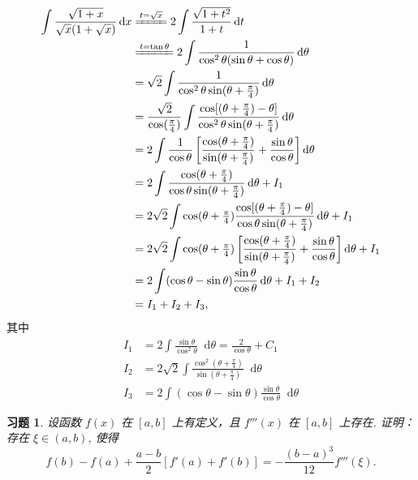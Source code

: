 \documentclass{ctexart}
\renewcommand\dif{\mathop{}\!\mathrm{d}}
\newcommand{\dx}{\ensuremath{\dif x}}
\newcommand{\dt}{\ensuremath{\dif t}}
\theoremstyle{plain}
\newtheorem{exercise}{习题}[subsection]
\theoremstyle{definition}
\begin{document}
\begin{align*}
    \int \frac{\sqrt{1 + x}}{\sqrt{x} (1 + \sqrt{x})} \dx
    &\xlongequal{t = \sqrt{x}} 2\int \frac{\sqrt{1 + t^2}}{1 + t} \dt \\
    &\xlongequal{t = \tan \theta} 2\int \frac{1}{\cos^2 \theta (\sin\theta + \cos\theta)} \dif \theta \\
    &= \sqrt{2} \int \frac{1}{\cos^2 \theta \sin(\theta + \frac \pi4)} \dif \theta \\
    &= \frac{\sqrt{2}}{\cos(\frac \pi4)} \int \frac{\cos[(\theta + \frac \pi4) - \theta]}{\cos^2 \theta \sin(\theta + \frac \pi4)} \dif \theta \\
    &= 2 \int \frac{1}{\cos\theta} 
        \sbr[3]{\frac{\cos(\theta + \frac \pi4)}{\sin(\theta + \frac \pi4)}
            + \frac{\sin\theta}{\cos\theta}}  \dif\theta \\
    &= 2 \int \frac{\cos(\theta + \frac \pi4)}{\cos\theta \sin(\theta + \frac \pi4)} \dif\theta + I_1 \\
    &= 2\sqrt{2} \int \cos(\theta + \tfrac \pi4) \frac{\cos[(\theta + \frac \pi4) - \theta]}{\cos\theta \sin(\theta + \frac \pi4)} \dif\theta 
        + I_1\\
    &= 2\sqrt{2} \int \cos(\theta + \tfrac \pi4) 
        \sbr[3]{\frac{\cos(\theta + \frac \pi4)}{\sin(\theta + \frac \pi4)}
                + \frac{\sin\theta}{\cos\theta}} \dif\theta 
                + I_1\\
    &= 2 \int (\cos\theta - \sin\theta) \frac{\sin\theta}{\cos\theta} \dif\theta 
                    + I_1 + I_2\\
    &= I_1 + I_2 + I_3,
\end{align*}
其中
\begin{align*}
    I_1 &= 2 \int \frac{\sin\theta}{\cos^2\theta} \dif\theta = \frac{2}{\cos\theta} + C_1\\
    I_2 &= 2\sqrt{2} \int \frac{\cos^2(\theta + \frac \pi4)}{\sin(\theta + \frac \pi4)} \dif\theta \\
    I_3 &= 2 \int (\cos\theta - \sin\theta) \frac{\sin\theta}{\cos\theta} \dif\theta
\end{align*}

\begin{exercise}
    设函数 $f(x)$ 在 $[a, b]$ 上有定义，且 $f'''(x)$ 在 $[a, b]$ 上存在. 证明：存在 $\xi \in (a, b)$, 使得
    \[
        f(b) - f(a) + \frac{a - b}{2} [f'(a) + f'(b)]
        = -\frac{(b - a)^3}{12} f'''(\xi).
    \]
\end{exercise}
\end{document}

